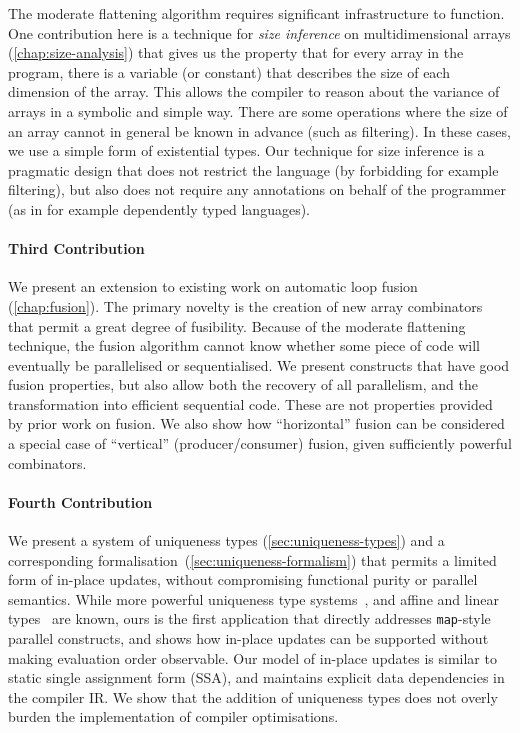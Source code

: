 The moderate flattening algorithm requires significant infrastructure
to function.  One contribution here is a technique for \textit{size
  inference} on multidimensional arrays (\cref{chap:size-analysis})
that gives us the property that for every array in the program, there
is a variable (or constant) that describes the size of each dimension
of the array.  This allows the compiler to reason about the variance
of arrays in a symbolic and simple way.  There are some operations
where the size of an array cannot in general be known in advance (such
as filtering).  In these cases, we use a simple form of existential
types.  Our technique for size inference is a pragmatic design that
does not restrict the language (by forbidding for example filtering),
but also does not require any annotations on behalf of the programmer
(as in for example dependently typed languages).

\paragraph{Third Contribution}

We present an extension to existing work on automatic loop fusion
(\cref{chap:fusion}).  The primary novelty is the creation of new
array combinators that permit a great degree of fusibility.  Because
of the moderate flattening technique, the fusion algorithm cannot know
whether some piece of code will eventually be parallelised or
sequentialised.  We present constructs that have good fusion
properties, but also allow both the recovery of all parallelism, and
the transformation into efficient sequential code.  These are not
properties provided by prior work on fusion.  We also show how
``horizontal'' fusion can be considered a special case of ``vertical''
(producer/consumer) fusion, given sufficiently powerful combinators.

\paragraph{Fourth Contribution}

We present a system of uniqueness types (\cref{sec:uniqueness-types})
and a corresponding formalisation~(\cref{sec:uniqueness-formalism})
that permits a limited form of in-place updates, without compromising
functional purity or parallel semantics.  While more powerful
uniqueness type systems~\cite{clean-uniqueness-types}, and affine and
linear
types~\cite{Tov:2011:PAT:1926385.1926436,Fahndrich:2002:AFP:543552.512532}
are known, ours is the first application that directly addresses
\texttt{map}-style parallel constructs, and shows how in-place updates
can be supported without making evaluation order observable.  Our
model of in-place updates is similar to static single assignment form
(SSA), and maintains explicit data dependencies in the compiler IR.
We show that the addition of uniqueness types does not overly burden
the implementation of compiler optimisations.

